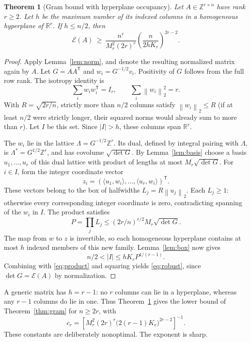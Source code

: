\documentclass[11pt]{article}
\newtheorem{theorem}{Theorem}[section]
\theoremstyle{remark}\newtheorem{remark}[theorem]{Remark}
\newcommand{\Z}{\mathbb Z}\newcommand{\R}{\mathbb R}\newcommand{\F}{\mathbb F}
\newcommand{\norm}[1]{\left\lVert #1\right\rVert}
\begin{document}
\begin{theorem}[Gram bound with hyperplane occupancy]\label{thm:robust}
Let $A\in\Z^{r\times n}$ have rank $r\ge2$. Let $h$ be the maximum number of its indexed columns in a homogeneous hyperplane of $\R^r$. If $h\le n/2$, then
\begin{equation}\label{eq:robust}
 \mathcal E(A)\ \ge\ \frac{n^r}{M_r^2(2r)^r}\left(\frac{n}{2hK_r}\right)^{2r-2}.
\end{equation}
\end{theorem}
\begin{proof}
Apply Lemma~\ref{lem:norm}, and denote the resulting normalized matrix again by $A$. Let $G=AA^{\mathsf T}$ and $w_i=G^{-1/2}v_i$. Positivity of $G$ follows from the full row rank. The isotropy identity is
\[
 \sum_i w_iw_i^{\mathsf T}=I_r,\qquad \sum_i\norm{w_i}_2^2=r.
\]
With $R=\sqrt{2r/n}$, strictly more than $n/2$ columns satisfy $\norm{w_i}_2\le R$ (if at least $n/2$ were strictly longer, their squared norms would already sum to more than $r$). Let $I$ be this set. Since $|I|>h$, these columns span $\R^r$.

The $w_i$ lie in the lattice $\Lambda=G^{-1/2}\Z^r$. Its dual, defined by integral pairing with $\Lambda$, is $\Lambda^*=G^{1/2}\Z^r$, and has covolume $\sqrt{\det G}$. By Lemma~\ref{lem:basis} choose a basis $u_1,\ldots,u_r$ of this dual lattice with product of lengths at most $M_r\sqrt{\det G}$. For $i\in I$, form the integer coordinate vector
\[
 z_i=(\langle u_1,w_i\rangle,\ldots,\langle u_r,w_i\rangle)^{\mathsf T}.
\]
These vectors belong to the box of halfwidths $L_j=R\norm{u_j}_2$. Each $L_j\ge1$: otherwise every corresponding integer coordinate is zero, contradicting spanning of the $w_i$ in $I$. The product satisfies
\begin{equation}\label{eq:product}
 P=\prod_j L_j\le (2r/n)^{r/2}M_r\sqrt{\det G}.
\end{equation}
The map from $w$ to $z$ is invertible, so each homogeneous hyperplane contains at most $h$ indexed members of this new family. Lemma~\ref{lem:box} now gives
\[
 n/2< |I|\le hK_rP^{1/(r-1)}.
\]
Combining with \eqref{eq:product} and squaring yields \eqref{eq:robust}, since $\det G=\mathcal E(A)$ by normalization.
\end{proof}

A generic matrix has $h=r-1$: no $r$ columns can lie in a hyperplane, whereas any $r-1$ columns do lie in one. Thus Theorem~\ref{thm:robust} gives the lower bound of Theorem~\ref{thm:gram} for $n\ge2r$, with
\begin{equation}\label{eq:cr}
 c_r=\left[M_r^2(2r)^r\bigl(2(r-1)K_r\bigr)^{2r-2}\right]^{-1}.
\end{equation}
These constants are deliberately nonoptimal. The exponent is sharp.
\end{document}
